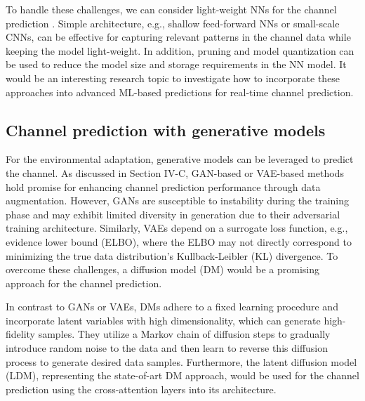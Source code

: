 \documentclass[lettersize,journal]{IEEEtran}
\begin{document}
To handle these challenges, we can consider light-weight NNs for the channel prediction \cite{Yang21_light}. Simple architecture, e.g., shallow feed-forward NNs or small-scale CNNs, can be effective for capturing relevant patterns in the channel data while keeping the model light-weight. In addition,  pruning and model quantization can be used to reduce the model size and storage requirements in the NN model. %
It would be an interesting research topic to investigate how to incorporate these approaches into advanced ML-based predictions for real-time channel prediction.

\subsection{Channel prediction with generative models}
For the environmental adaptation, generative models can be leveraged to predict the channel. As discussed in Section IV-C, GAN-based or VAE-based methods hold promise for enhancing channel prediction performance through data augmentation. %
However, GANs are susceptible to instability during the training phase and may exhibit limited diversity in generation due to their adversarial training architecture. Similarly, VAEs depend on a surrogate loss function, e.g., evidence lower bound (ELBO), where the ELBO may not directly correspond to minimizing the true data distribution's Kullback-Leibler (KL) divergence. To overcome these challenges, a diffusion model (DM) would be a promising approach for the channel prediction.

In contrast to GANs or VAEs, DMs adhere to a fixed learning procedure and incorporate latent variables with high dimensionality, which can generate high-fidelity samples. They utilize a Markov chain of diffusion steps to gradually introduce random noise to the data and then learn to reverse this diffusion process to generate desired data samples. %
Furthermore, the latent diffusion model (LDM), representing the state-of-art DM approach, would be used for the channel prediction using the cross-attention layers into its architecture.
\end{document}
